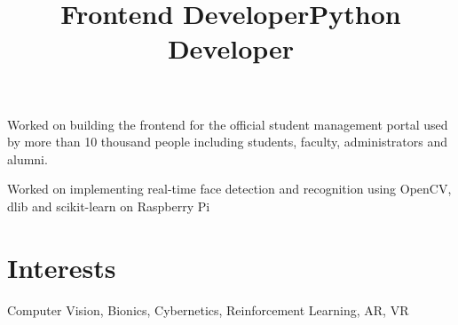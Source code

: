 \documentclass[margin]{res}
\begin{document}
\begin{resume}
      \title{\textbf{Frontend Developer}}
      \begin{position}
        Worked on building the frontend for the official student management portal used by more than 10 thousand people including students, faculty, administrators and alumni.
      \end{position}

      \title{\textbf{Python Developer}}
      \begin{position}
        Worked on implementing real-time face detection and recognition using OpenCV, dlib and scikit-learn on Raspberry Pi
      \end{position}

    \section{Interests}
      Computer Vision, Bionics, Cybernetics, Reinforcement Learning, AR, VR
  \end{resume}
\end{document}
